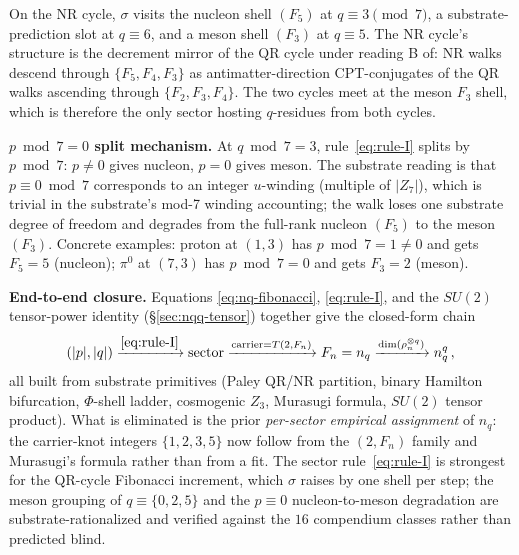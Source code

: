 \documentclass[11pt]{article}
\begin{document}
On the NR cycle, $\sigma$ visits the nucleon shell $(F_5)$ at $q \equiv 3 \pmod 7$, a substrate-prediction slot at $q \equiv 6$, and a meson shell $(F_3)$ at $q \equiv 5$.  The NR cycle's structure is the decrement mirror of the QR cycle under reading B of: NR walks descend through $\{F_5, F_4, F_3\}$ as antimatter-direction CPT-conjugates of the QR walks ascending through $\{F_2, F_3, F_4\}$.  The two cycles meet at the meson $F_3$ shell, which is therefore the only sector hosting $q$-residues from both cycles.

\textbf{$p \bmod 7 = 0$ split mechanism.}  At $q \bmod 7 = 3$, rule~\eqref{eq:rule-I} splits by $p \bmod 7$: $p \neq 0$ gives nucleon, $p = 0$ gives meson.  The substrate reading is that $p \equiv 0 \bmod 7$ corresponds to an integer $u$-winding (multiple of $|Z_7|$), which is trivial in the substrate's mod-7 winding accounting; the walk loses one substrate degree of freedom and degrades from the full-rank nucleon $(F_5)$ to the meson $(F_3)$.  Concrete examples: proton at $(1, 3)$ has $p \bmod 7 = 1 \neq 0$ and gets $F_5 = 5$ (nucleon); $\pi^0$ at $(7, 3)$ has $p \bmod 7 = 0$ and gets $F_3 = 2$ (meson).

\textbf{End-to-end closure.}  Equations \eqref{eq:nq-fibonacci}, \eqref{eq:rule-I}, and the $SU(2)$ tensor-power identity (\S\ref{sec:nqq-tensor}) together give the closed-form chain
\begin{equation}
  (|p|, |q|) \xrightarrow{\eqref{eq:rule-I}} \mathrm{sector} \xrightarrow{\text{carrier} = T(2, F_n)} F_n = n_q \xrightarrow{\dim(\rho_n^{\otimes q})} n_q^q \, ,
\end{equation}
all built from substrate primitives (Paley QR/NR partition, binary Hamilton bifurcation, $\Phi$-shell ladder, cosmogenic $Z_3$, Murasugi formula, $SU(2)$ tensor product).  What is eliminated is the prior \emph{per-sector empirical assignment} of $n_q$: the carrier-knot integers $\{1, 2, 3, 5\}$ now follow from the $(2, F_n)$ family and Murasugi's formula rather than from a fit.  The sector rule~\eqref{eq:rule-I} is strongest for the QR-cycle Fibonacci increment, which $\sigma$ raises by one shell per step; the meson grouping of $q \equiv \{0, 2, 5\}$ and the $p \equiv 0$ nucleon-to-meson degradation are substrate-rationalized and verified against the $16$ compendium classes rather than predicted blind.
\end{document}
